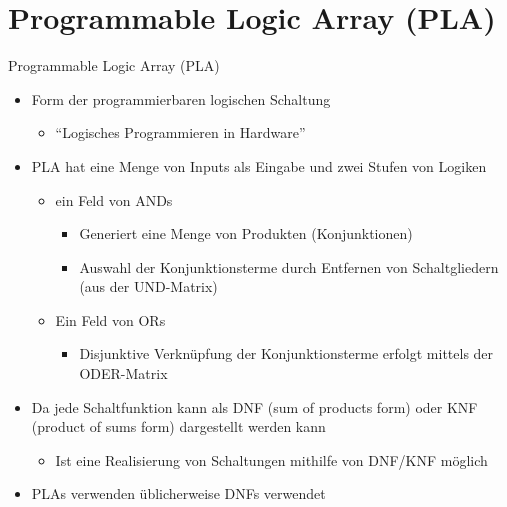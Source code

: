 \documentclass[12pt%
,xcolor=table
,aspectratio=169%
]{beamer}
\begin{document}
\section{Programmable Logic Array (PLA)}
\begin{frame}{Programmable Logic Array (PLA)}
\begin{itemize}
	\item Form der programmierbaren logischen Schaltung
	\begin{itemize}
		\item \enquote{Logisches Programmieren in Hardware}
	\end{itemize}
	\item PLA hat eine Menge von Inputs als Eingabe und zwei Stufen von Logiken
	\begin{itemize}
		\item ein Feld von ANDs
		\begin{itemize}
			\item Generiert eine Menge von Produkten (Konjunktionen)
			\item Auswahl der Konjunktionsterme durch Entfernen von Schaltgliedern (aus der UND-Matrix)
		\end{itemize}
		\item Ein Feld von ORs
		\begin{itemize}
			\item Disjunktive Verknüpfung der Konjunktionsterme erfolgt mittels der ODER-Matrix
		\end{itemize}
	\end{itemize}
	\item Da jede Schaltfunktion kann als DNF (sum of products form) oder KNF (product of sums form) dargestellt werden kann
	\begin{itemize}
		\item Ist eine Realisierung von Schaltungen mithilfe von DNF/KNF möglich
	\end{itemize}
	\item PLAs verwenden üblicherweise DNFs verwendet
\end{itemize}

\end{frame}
\end{document}
